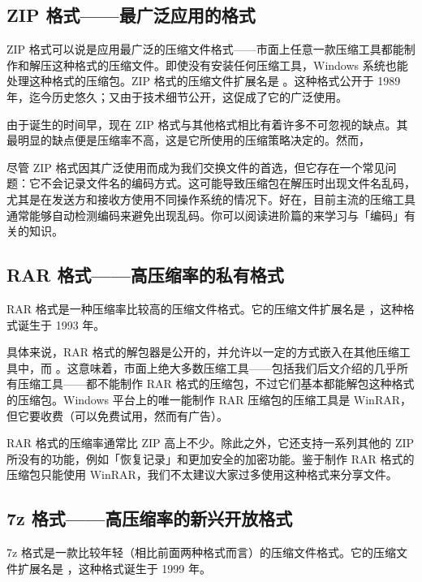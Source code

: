 \subsection{ZIP 格式——最广泛应用的格式}

ZIP 格式可以说是应用最广泛的压缩文件格式——市面上任意一款压缩工具都能制作和解压这种格式的压缩文件。即使没有安装任何压缩工具，Windows 系统也能处理这种格式的压缩包。ZIP 格式的压缩文件扩展名是 。这种格式公开于 1989 年，迄今历史悠久；又由于技术细节公开，这促成了它的广泛使用。

由于诞生的时间早，现在 ZIP 格式与其他格式相比有着许多不可忽视的缺点。其最明显的缺点便是压缩率不高，这是它所使用的压缩策略决定的。然而，

\begin{note}
  尽管 ZIP 格式因其广泛使用而成为我们交换文件的首选，但它存在一个常见问题：它不会记录文件名的编码方式。这可能导致压缩包在解压时出现文件名乱码，尤其是在发送方和接收方使用不同操作系统的情况下。好在，目前主流的压缩工具通常能够自动检测编码来避免出现乱码。你可以阅读进阶篇的来学习与「编码」有关的知识。
\end{note}
\subsection{RAR 格式——高压缩率的私有格式}
RAR 格式是一种压缩率比较高的压缩文件格式。它的压缩文件扩展名是 ，这种格式诞生于 1993 年。

具体来说，RAR 格式的解包器是公开的，并允许以一定的方式嵌入在其他压缩工具中，而 。这意味着，市面上绝大多数压缩工具——包括我们后文介绍的几乎所有压缩工具——都不能制作 RAR 格式的压缩包，不过它们基本都能解包这种格式的压缩包。Windows 平台上的唯一能制作 RAR 压缩包的压缩工具是 WinRAR，但它要收费（可以免费试用，然而有广告）。

RAR 格式的压缩率通常比 ZIP 高上不少。除此之外，它还支持一系列其他的 ZIP 所没有的功能，例如「恢复记录」和更加安全的加密功能。鉴于制作 RAR 格式的压缩包只能使用 WinRAR，我们不太建议大家过多使用这种格式来分享文件。

\subsection{7z 格式——高压缩率的新兴开放格式}

7z 格式是一款比较年轻（相比前面两种格式而言）的压缩文件格式。它的压缩文件扩展名是 ，这种格式诞生于 1999 年。

